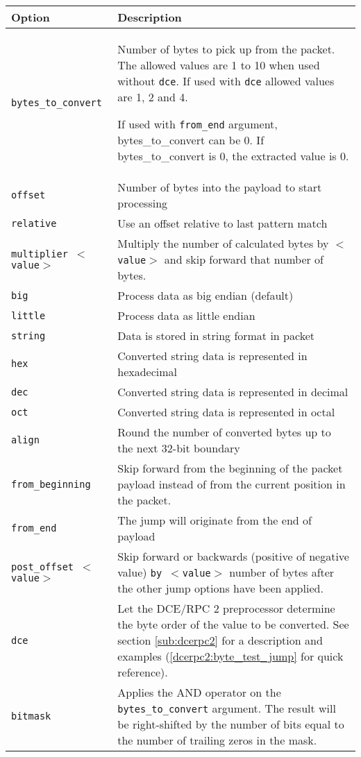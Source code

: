 \documentclass[english]{report}
\begin{document}
\begin{tabular}{| l | p{4.5in} |}
\hline
{\bf Option} & {\bf Description}\\
\hline
\hline
\texttt{bytes\_to\_convert} &

Number of bytes to pick up from the packet. The allowed values are 1 to 10 when
used without \texttt{dce}. If used with \texttt{dce} allowed values are 1, 2 and 4.

If used with \texttt{from\_end} argument, bytes\_to\_convert can be 0. If 
bytes\_to\_convert is 0, the extracted value is 0.\\
\hline
\texttt{offset} & Number of bytes into the payload to start processing\\
\hline
\texttt{relative} & Use an offset relative to last pattern match\\
\hline
\texttt{multiplier $<$value$>$} & Multiply the number of calculated bytes by
\texttt{$<$value$>$} and skip forward that number of bytes.\\
\hline
\texttt{big} & Process data as big endian (default)\\
\hline
\texttt{little} & Process data as little endian\\
\hline
\texttt{string} & Data is stored in string format in packet\\
\hline
\texttt{hex} & Converted string data is represented in hexadecimal\\
\hline
\texttt{dec} & Converted string data is represented in decimal\\
\hline
\texttt{oct} & Converted string data is represented in octal\\
\hline
\texttt{align} & Round the number of converted bytes up to the next 32-bit boundary\\
\hline
\texttt{from\_beginning} & Skip forward from the beginning of the packet
payload instead of from the current position in the packet.\\
\hline
\texttt{from\_end} & The jump will originate from the end of payload\\
\hline
\texttt{post\_offset $<$value$>$} & Skip forward or backwards (positive of
negative value) \texttt{by $<$value$>$} number of bytes after the other jump
options have been applied.\\
\hline
\texttt{dce} & Let the DCE/RPC 2 preprocessor determine the byte order of the
value to be converted.  See section \ref{sub:dcerpc2} for a description and
examples (\ref{dcerpc2:byte_test_jump} for quick reference).\\
\hline
\texttt{bitmask} & Applies the AND operator on the \texttt{bytes\_to\_convert} 
argument. The result will be right-shifted by the number of bits equal to the  
number of trailing zeros in the mask.\\
\hline
\end{tabular}
\end{document}
